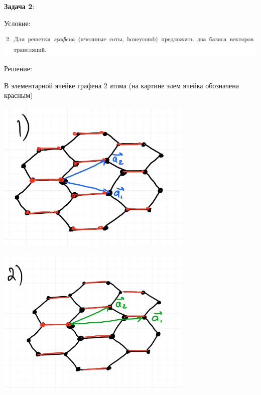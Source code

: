 \documentclass[12pt]{article}
\begin{document}
\begin{large}
\par \textbf{Задача 2}:
\par Условие:
\par
\includegraphics[width=1\textwidth]{photo_2.png}
\par Решение:
\par
\par В элементарной ячейке графена 2 атома (на картине элем ячейка обозначена красным)
\par
\includegraphics[width=0.7\textwidth]{photo_21.jpg}
\par
\includegraphics[width=0.7\textwidth]{photo_22.jpg}



\end{large}
\end{document}
